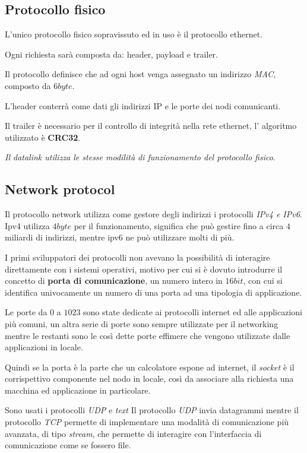 \subsection{Protocollo fisico}
L'unico protocollo fisico sopravissuto ed in uso è il protocollo ethernet.

Ogni richiesta sarà composta da: header, payload e trailer.

Il protocollo definisce che ad ogni host venga assegnato un indirizzo
\emph{MAC}, composto da $6byte$.

L'header conterrà come dati gli indirizzi IP e le porte dei nodi comunicanti.

Il trailer è necessario per il controllo di integrità nella rete ethernet, l'
algoritmo utilizzato è \textbf{CRC32}.

\emph{Il datalink utilizza le stesse modilità di funzionamento del protocollo
fisico}.

\subsection{Network protocol}
Il protocollo network utilizza come gestore degli indirizzi i protocolli
\emph{IPv4 e IPv6}.
Ipv4 utilizza $4byte$ per il funzionamento, significa che può gestire fino a 
circa $4$ miliardi di indirizzi, mentre ipv6 ne può utilizzare molti di più.

I primi sviluppatori dei protocolli non avevano la possibilità
di interagire direttamente con i sistemi operativi, motivo per cui si è dovuto
introdurre il concetto di \textbf{porta di comunicazione}, un numero intero
in $16bit$, con cui si identifica univocamente un numero di una porta ad una
tipologia di applicazione.

Le porte da $0$ a $1023$ sono state dedicate ai protocolli internet ed alle
applicazioni più comuni, un altra serie di porte sono sempre utilizzate per
il networking  mentre le restanti sono le così dette porte effimere che vengono
utilizzate dalle applicazioni in locale.

Quindi se la porta è la parte che un calcolatore espone ad internet, il
\emph{socket} è il corrispettivo componente nel nodo in locale, così da
associare alla richiesta una macchina ed applicazione in particolare.


Sono usati i protocolli \emph{UDP} e \emph{text}
Il protocollo \emph{UDP} invia datagrammi mentre il protocollo \emph{TCP}
permette di implementare una modalità di comunicazione più avanzata, di tipo
\emph{stream}, che permette di interagire con l'interfaccia di comunicazione
come se fossero file.

